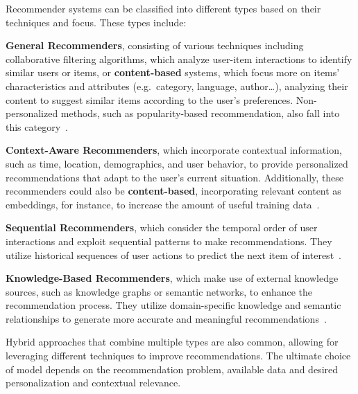 Recommender systems can be classified into different types based on their techniques and focus. These types include:
\begin{compactitem}[\textbullet]
    \item \textbf{General Recommenders}, consisting of various techniques including collaborative filtering algorithms, which analyze user-item interactions to identify similar users or items, or \textbf{content-based} systems, which focus more on items' characteristics and attributes (e.g.\ category, language, author\ldots), analyzing their content to suggest similar items according to the user's preferences. Non-personalized methods, such as popularity-based recommendation, also fall into this category~\cite{CHAPTER:RS-HANDBOOK-GENERAL}.
    \item \textbf{Context-Aware Recommenders}, which incorporate contextual information, such as time, location, demographics, and user behavior, to provide personalized recommendations that adapt to the user's current situation. Additionally, these recommenders could also be \textbf{content-based}, incorporating relevant content as embeddings, for instance, to increase the amount of useful training data~\cite{CHAPTER:RS-HANDBOOK-CONTEXT}.
    \item \textbf{Sequential Recommenders}, which consider the temporal order of user interactions and exploit sequential patterns to make recommendations. They utilize historical sequences of user actions to predict the next item of interest~\cite[Chapter 3.5]{CHAPTER:RS-HANDBOOK-MUSIC}.
    \item \textbf{Knowledge-Based Recommenders}, which make use of external knowledge sources, such as knowledge graphs or semantic networks, to enhance the recommendation process. They utilize domain-specific knowledge and semantic relationships to generate more accurate and meaningful recommendations~\cite{CHAPTER:RS-HANDBOOK-KNOWLEDGE}.
\end{compactitem}
Hybrid approaches that combine multiple types are also common, allowing for leveraging different techniques to improve recommendations. The ultimate choice of model depends on the recommendation problem, available data and desired personalization and contextual relevance.